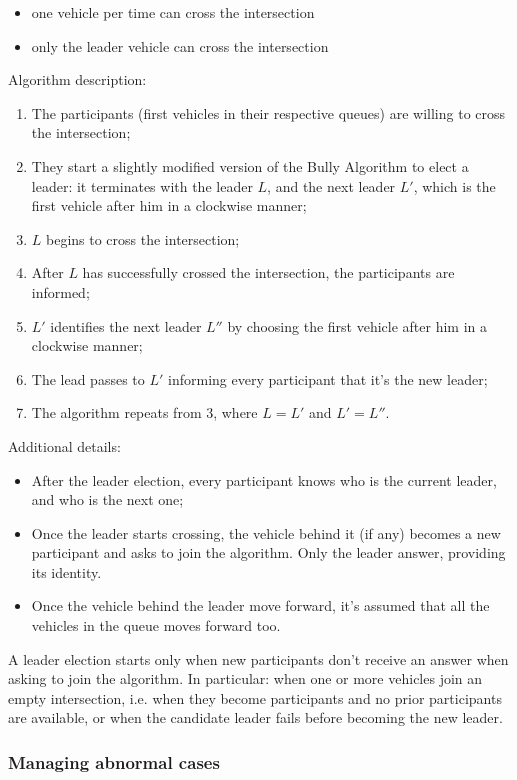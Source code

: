 \documentclass{memoir}
\begin{document}
\begin{itemize}
	\item one vehicle per time can cross the intersection
	\item only the leader vehicle can cross the intersection
\end{itemize}
Algorithm description:
\begin{enumerate}
	\item The participants (first vehicles in their respective queues) are willing to cross the intersection;
	\item They start a slightly modified version of the Bully Algorithm to elect a leader: it terminates with the leader $L$, and the next leader $L'$, which is the first vehicle after him in a clockwise manner;
	\item $L$ begins to cross the intersection;
	\item After $L$ has successfully crossed the intersection, the participants are informed;
	\item $L'$ identifies the next leader $L''$ by choosing the first vehicle after him in a clockwise manner;
	\item The lead passes to $L'$ informing every participant that it's the new leader;
	\item The algorithm repeats from 3, where $L = L'$ and $L' = L''$.
\end{enumerate}
Additional details:
\begin{itemize}
	\item After the leader election, every participant knows who is the current leader, and who is the next one;
	\item Once the leader starts crossing, the vehicle behind it (if any) becomes a new participant and asks to join the algorithm. Only the leader answer, providing its identity.
	\item Once the vehicle behind the leader move forward, it's assumed that all the vehicles in the queue moves forward too.
\end{itemize}
A leader election starts only when new participants don't receive an answer when asking to join the algorithm. In particular: when one or more vehicles join an empty intersection, i.e. when they become participants and no prior participants are available, or when the candidate leader fails before becoming the new leader.

\subsubsection{Managing abnormal cases}
\end{document}
